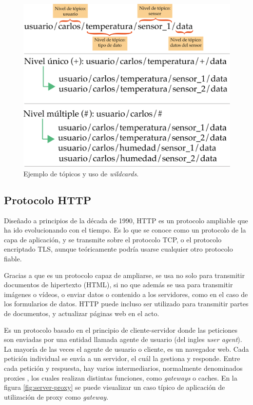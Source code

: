 \begin{figure}[htpb]
	\centering
	\includegraphics[scale=.38]{./Figures/esquema-wildcard.png}
	\caption{Ejemplo de tópicos y uso de \textit{wildcards}.}
	\label{fig:mqtt-wildcards}
\end{figure}



\subsection{Protocolo HTTP}

Diseñado a principios de la década de 1990, HTTP es un protocolo ampliable que ha ido evolucionando con el tiempo. Es lo que se conoce como un protocolo de la capa de aplicación, y se transmite sobre el protocolo TCP, o el protocolo encriptado TLS, aunque teóricamente podría usarse cualquier otro protocolo fiable. 

Gracias a que es un protocolo capaz de ampliarse, se usa no solo para transmitir documentos de hipertexto (HTML), si no que además se usa para transmitir imágenes o vídeos, o enviar datos o contenido a los servidores, como en el caso de los formularios de datos. HTTP puede incluso ser utilizado para transmitir partes de documentos, y actualizar páginas web en el acto.

Es un protocolo basado en el principio de cliente-servidor donde las peticiones son enviadas por una entidad llamada agente de usuario (del ingles \textit{user agent}). La mayoría de las veces el agente de usuario o cliente,  es un navegador web. Cada petición individual se envía a un servidor, el cuál la gestiona y responde. Entre cada petición y respuesta, hay varios intermediarios, normalmente denominados proxies \citep{WEBSITE:18} , los cuales realizan distintas funciones, como \textit{gateways} o caches.  En la figura  \ref{fig:server-proxy} se puede visualizar un caso típico de aplicación de utilización de proxy como \textit{gateway}.

